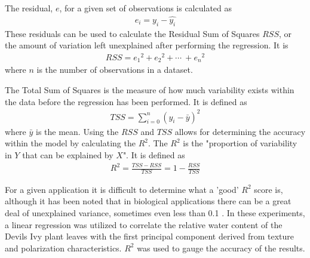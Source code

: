 The residual, $e$, for a given set of observations is calculated as
%
\begin{align}
    e_i = y_i - \hat{y_i}
\end{align}
%
These residuals can be used to calculate the Residual Sum of Squares \(RSS\), or the amount of variation left unexplained after performing the regression.  It is
\begin{align}
    RSS = {e_1}^2 + {e_2}^2 + \cdots\ + {e_n}^2
\end{align}
where $n$ is the number of observations in a dataset.

The Total Sum of Squares is the measure of how much variability exists within the data before the regression has been performed.  It is defined as
\begin{align}
    TSS = \sum_{i=0}^n (y_i - \bar{y})^2
\end{align}
where $\bar{y}$ is the mean.  Using the $RSS$ and $TSS$ allows for determining the accuracy within the model by calculating the $R^2$.  The $R^2$ is the "proportion of variability in $Y$ that can be explained by $X$". It is defined as
\begin{align}
    R^2 = \frac{TSS - RSS}{TSS} = 1 - \frac{RSS}{TSS}
\end{align}

For a given application it is difficult to determine what a 'good' $R^2$ score is, although it has been noted that in biological applications there can be a great deal of unexplained variance, sometimes even less than 0.1 \cite{stats}.  In these experiments, a linear regression was utilized to correlate the relative water content of the Devils Ivy plant leaves with the first principal component derived from texture and polarization characteristics.  $R^2$ was used to gauge the accuracy of the results.

